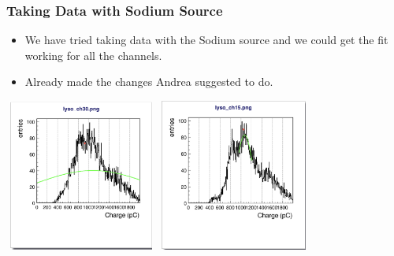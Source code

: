 \documentclass{beamer}
\begin{document}
\begin{frame}
\frametitle{Taking Data with Sodium Source}
\begin{itemize}
    \item We have tried taking data with the Sodium source and we could get the fit working for all the channels.
    \item Already made the changes Andrea suggested to do.
\end{itemize}
\centering
\includegraphics[width=5cm, height=5cm]{../btl_files/sodium_fit_fail/Screenshot 2025-01-26 at 10.59.21.png}
\includegraphics[width=5cm, height=5cm]{../btl_files/sodium_fit_fail/Screenshot 2025-01-26 at 10.59.34.png}
\end{frame}
\end{document}
